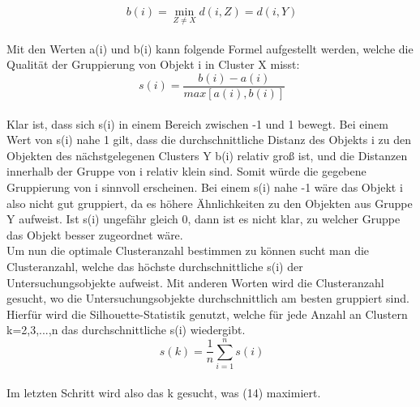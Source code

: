 \documentclass[12pt,titlepage]{article}
\begin{document}
\begin{equation}
 \ b(i)=\min_{Z\neq X} d(i,Z)=d(i,Y)
\end{equation} \\
Mit den Werten a(i) und b(i) kann folgende Formel aufgestellt werden, welche die Qualität der Gruppierung von Objekt i in Cluster X misst:
\begin{equation}
 \ s(i)=\frac{b(i)-a(i)}{max[a(i),b(i)]}
\end{equation} \\
Klar ist, dass sich s(i) in einem Bereich zwischen -1 und 1 bewegt. Bei einem Wert von s(i) nahe 1 gilt, dass die durchschnittliche Distanz des Objekts i zu den Objekten des nächstgelegenen Clusters Y b(i) relativ groß ist, und die Distanzen innerhalb der Gruppe von i relativ klein sind. Somit würde die gegebene Gruppierung von i sinnvoll erscheinen. Bei einem s(i) nahe -1 wäre das Objekt i also nicht gut gruppiert, da es höhere Ähnlichkeiten zu den Objekten aus Gruppe Y aufweist. Ist s(i) ungefähr gleich 0, dann ist es nicht klar, zu welcher Gruppe das Objekt besser zugeordnet wäre.\\
Um nun die optimale Clusteranzahl bestimmen zu können sucht man die Clusteranzahl, welche das höchste durchschnittliche s(i) der Untersuchungsobjekte aufweist. Mit anderen Worten wird die Clusteranzahl gesucht, wo die Untersuchungsobjekte durchschnittlich am besten gruppiert sind. Hierfür wird die Silhouette-Statistik genutzt, welche für jede Anzahl an Clustern k=2,3,...,n das durchschnittliche s(i) wiedergibt. \\
\begin{equation}
 \ s(k)=\frac{1}{n}\sum_{i=1}^{n} s(i)
\end{equation} \\
Im letzten Schritt wird also das k gesucht, was (14) maximiert. \\
\end{document}
